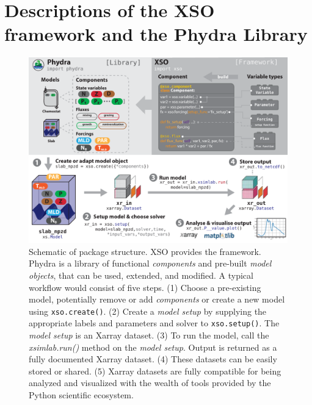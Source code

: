 \documentclass[journal abbreviation, manuscript]{copernicus}
\begin{document}
\section{Descriptions of the XSO framework and the Phydra Library} \label{Section:phydrapackage}
%
\begin{figure}[t]
\includegraphics[width=12cm]{Figures/firstdraft_schematics/00_schematics_Package.pdf}
\caption{Schematic of package structure. XSO provides the framework. Phydra is a library of functional \textit{components} and pre-built \textit{model objects}, that can be used, extended, and modified. A typical workflow would consist of five steps. (1) Choose a pre-existing model, potentially remove or add \textit{components} or create a new model using \texttt{xso.create()}. (2) Create a \textit{model setup} by supplying the appropriate labels and parameters and solver to \texttt{xso.setup()}. The \textit{model setup} is an Xarray dataset. (3) To run the model, call the \textit{xsimlab.run()} method on the \textit{model setup}. Output is returned as a fully documented Xarray dataset. (4) These datasets can be easily stored or shared. (5) Xarray datasets are fully compatible for being analyzed and visualized with the wealth of tools provided by the Python scientific ecosystem.}
\label{Figure:PhydraXSOPackageSchematics}
\end{figure}

\end{document}
